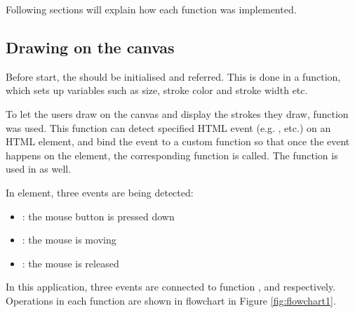 \documentclass[12pt,twoside]{report}
\begin{document}
Following sections will explain how each function was implemented.

\subsection{Drawing on the canvas}
Before start, the  should be initialised and referred. This is done in a  function, which sets up variables such as size, stroke color and stroke width etc.

To let the users draw on the canvas and display the strokes they draw, function
 was used. This function can detect specified HTML event
(e.g. ,  etc.) on an HTML element, and bind the
event to a custom function so that once the event happens on the element, the
corresponding function is called. The function is used in  as well.

In  element, three events are being detected: 
\begin{itemize}
    \item {}: the mouse button is pressed down
    \item {}: the mouse is moving
    \item {}: the mouse is released
\end{itemize}

In this application, three events are connected to function
,  and 
respectively. Operations in each function are shown in flowchart in Figure
\ref{fig:flowchart1}.
\end{document}
